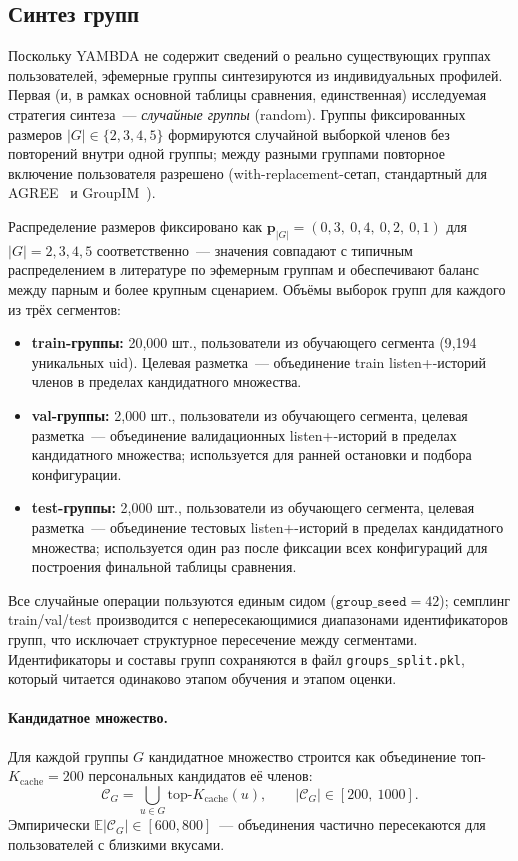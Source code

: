 \subsection{Синтез групп}\label{subsec:ch3:groups-synthesis}

Поскольку YAMBDA не содержит сведений о реально существующих группах пользователей, эфемерные группы синтезируются из индивидуальных профилей. Первая (и, в рамках основной таблицы сравнения, единственная) исследуемая стратегия синтеза~--- \emph{случайные группы} (random). Группы фиксированных размеров $|G| \in \{2, 3, 4, 5\}$ формируются случайной выборкой членов без повторений внутри одной группы; между разными группами повторное включение пользователя разрешено (with-replacement-сетап, стандартный для AGREE~\cite{cao2018agree} и GroupIM~\cite{sankar2020groupim}).

Распределение размеров фиксировано как $\mathbf{p}_{|G|} = (0{,}3,\ 0{,}4,\ 0{,}2,\ 0{,}1)$ для $|G| = 2, 3, 4, 5$ соответственно~--- значения совпадают с типичным распределением в литературе по эфемерным группам и обеспечивают баланс между парным и более крупным сценарием. Объёмы выборок групп для каждого из трёх сегментов:
\begin{itemize}
    \item \textbf{train-группы:} 20{,}000 шт., пользователи из обучающего сегмента (9{,}194 уникальных uid). Целевая разметка~--- объединение train listen+-историй членов в пределах кандидатного множества.
    \item \textbf{val-группы:} 2{,}000 шт., пользователи из обучающего сегмента, целевая разметка~--- объединение валидационных listen+-историй в пределах кандидатного множества; используется для ранней остановки и подбора конфигурации.
    \item \textbf{test-группы:} 2{,}000 шт., пользователи из обучающего сегмента, целевая разметка~--- объединение тестовых listen+-историй в пределах кандидатного множества; используется один раз после фиксации всех конфигураций для построения финальной таблицы сравнения.
\end{itemize}
Все случайные операции пользуются единым сидом ($\mathtt{group\_seed} = 42$); семплинг train/val/test производится с непересекающимися диапазонами идентификаторов групп, что исключает структурное пересечение между сегментами. Идентификаторы и составы групп сохраняются в файл \texttt{groups\_split.pkl}, который читается одинаково этапом обучения и этапом оценки.

\paragraph{Кандидатное множество.} Для каждой группы $G$ кандидатное множество строится как объединение топ-$K_{\mathrm{cache}} = 200$ персональных кандидатов её членов:
\begin{equation*}
    \mathcal{C}_G = \bigcup_{u \in G} \mathrm{top}\text{-}K_{\mathrm{cache}}(u), \qquad |\mathcal{C}_G| \in [200,\ 1000].
\end{equation*}
Эмпирически $\mathbb{E}|\mathcal{C}_G| \in [600, 800]$~--- объединения частично пересекаются для пользователей с близкими вкусами.


